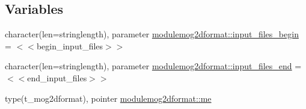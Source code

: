\subsection*{Variables}
\begin{DoxyCompactItemize}
\item 
character(len=stringlength), parameter \mbox{\hyperlink{namespacemodulemog2dformat_a9153156b80854bc74809b654b88cde04}{modulemog2dformat\+::input\+\_\+files\+\_\+begin}} = \textquotesingle{}$<$$<$begin\+\_\+input\+\_\+files$>$$>$\textquotesingle{}
\item 
character(len=stringlength), parameter \mbox{\hyperlink{namespacemodulemog2dformat_ad52b244ec5767f8c93a8186934533613}{modulemog2dformat\+::input\+\_\+files\+\_\+end}} = \textquotesingle{}$<$$<$end\+\_\+input\+\_\+files$>$$>$\textquotesingle{}
\item 
type(t\+\_\+mog2dformat), pointer \mbox{\hyperlink{namespacemodulemog2dformat_a5a01bc4ba0aea55aa0198799d344547a}{modulemog2dformat\+::me}}
\end{DoxyCompactItemize}
